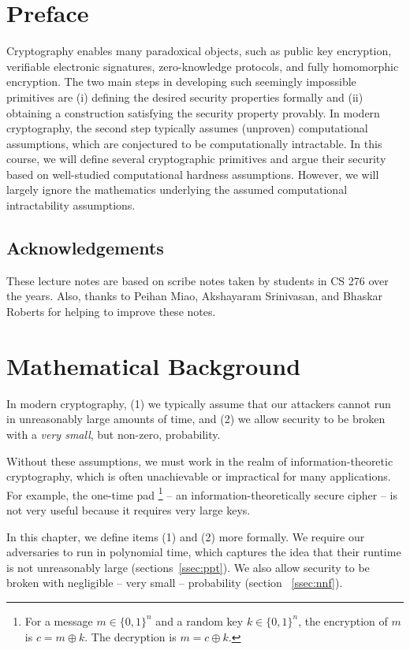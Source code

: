 \documentclass[12pt]{tufte-book}
\begin{document}
\chapter*{Preface}
Cryptography enables many paradoxical objects, such as public key encryption, verifiable electronic signatures, zero-knowledge protocols, and fully homomorphic encryption.  The two main steps in developing such seemingly impossible primitives are (i) defining the desired security properties formally and (ii) obtaining a construction satisfying the security property provably. In modern cryptography, the second step typically assumes (unproven) computational assumptions, which are conjectured to be computationally intractable. In this course, we will define several cryptographic primitives and argue their security based on well-studied computational hardness assumptions. However, we will largely ignore the mathematics underlying the assumed computational intractability assumptions.

\section*{Acknowledgements}
These lecture notes are based on scribe notes taken by students in CS 276 over the years. Also, thanks to Peihan Miao, Akshayaram Srinivasan, and Bhaskar Roberts for helping to improve these notes.
\newcommand{\sanjam}[1]{{\color{red} Sanjam: #1}}

\newcommand{\bhaskar}[1]{{\color{ForestGreen} Bhaskar: #1}}


\mainmatter
\chapter{Mathematical Background}
\label{sec:mb}

In modern cryptography, (1) we typically assume that our attackers cannot run in unreasonably large amounts of time, and (2) we allow security to be broken with a \emph{very small}, but non-zero, probability.

Without these assumptions, we must work in the realm of information-theoretic cryptography, which is often unachievable or impractical for many applications. For example, the one-time pad
\footnote{For a message $m \in \{0,1\}^n$ and a random key $k \in \{0,1\}^n$, the encryption of $m$ is $c = m \oplus k$. The decryption is $m = c \oplus k$.}
-- an information-theoretically secure cipher -- is not very useful because it requires very large keys.

In this chapter, we define items (1) and (2) more formally. We require our adversaries to run in polynomial time, which captures the idea that their runtime is not unreasonably large (sections~\ref{ssec:ppt}). We also allow security to be broken with negligible -- very small -- probability (section ~\ref{ssec:nnf}). 
\end{document}
